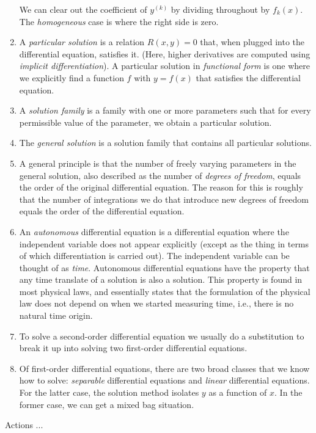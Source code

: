 \documentclass{amsart}
\begin{document}
\begin{enumerate}
  We can clear out the coefficient of $y^{(k)}$ by dividing throughout
  by $f_k(x)$. The {\em homogeneous} case is where the right side is
  zero.
\item A {\em particular solution} is a relation $R(x,y) = 0$ that,
  when plugged into the differential equation, satisfies it. (Here,
  higher derivatives are computed using {\em implicit
  differentiation}). A particular solution in {\em functional form} is
  one where we explicitly find a function $f$ with $y = f(x)$ that
  satisfies the differential equation.
\item A {\em solution family} is a family with one or more parameters
  such that for every permissible value of the parameter, we obtain a
  particular solution.
\item The {\em general solution} is a solution family that contains
  all particular solutions.
\item A general principle is that the number of freely varying
  parameters in the general solution, also described as the number of
  {\em degrees of freedom}, equals the order of the original
  differential equation. The reason for this is roughly that the
  number of integrations we do that introduce new degrees of freedom
  equals the order of the differential equation.
\item An {\em autonomous} differential equation is a differential
  equation where the independent variable does not appear explicitly
  (except as the thing in terms of which differentiation is carried
  out). The independent variable can be thought of as {\em
  time}. Autonomous differential equations have the property that any
  time translate of a solution is also a solution. This property is
  found in most physical laws, and essentially states that the
  formulation of the physical law does not depend on when we started
  measuring time, i.e., there is no natural time origin.
\item To solve a second-order differential equation we usually do a
  substitution to break it up into solving two first-order
  differential equations.
\item Of first-order differential equations, there are two broad
  classes that we know how to solve: {\em separable} differential
  equations and {\em linear} differential equations. For the latter
  case, the solution method isolates $y$ as a function of $x$. In the
  former case, we can get a mixed bag situation.
\end{enumerate}

Actions ...
\end{document}

